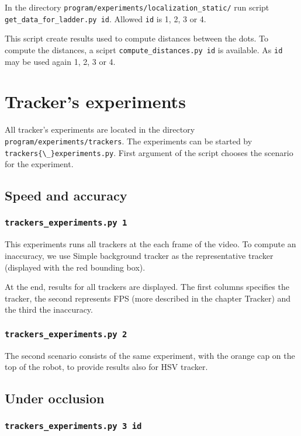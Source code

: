 In the directory \verb+program/experiments/localization_static/+ run script
\verb+get_data_for_ladder.py id+. Allowed \verb+id+ is 1, 2, 3 or 4.

This script create results used to compute distances between the dots. To
compute the distances, a sciprt \verb+compute_distances.py id+ is available. As
\verb+id+ may be used again 1, 2, 3 or 4. 

\section{Tracker's experiments}

All tracker's experiments are located in the directory
\verb+program/experiments/trackers+. The experiments can be started by \verb+trackers{\_}experiments.py+. First argument of the script chooses the scenario for the experiment.

\subsection*{Speed and accuracy}

\subsubsection*{\texttt{trackers{\_}experiments.py 1}}

This experiments runs all trackers at the each frame of the video. To compute
an inaccuracy, we use Simple background tracker as the representative tracker
(displayed with the red bounding box).

At the end, results for all trackers are displayed. The first columns specifies
the tracker, the second represents FPS (more described in the chapter Tracker)
and the third the inaccuracy.

\subsubsection*{\texttt{trackers{\_}experiments.py 2}}

The second scenario consists of the same experiment, with the orange cap on the
top of the robot, to provide results also for HSV tracker.

\subsection*{Under occlusion}

\subsubsection*{\texttt{trackers{\_}experiments.py 3 {id}}}

